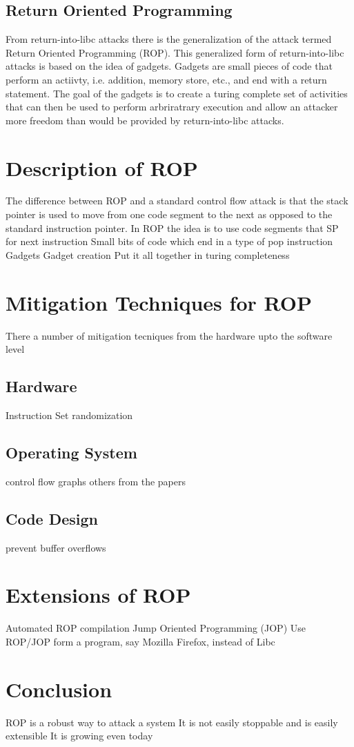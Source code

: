 \documentclass[11pt]{amsart}
\begin{document}
\subsection*{Return Oriented Programming}
From return-into-libc attacks there is the generalization of the attack termed Return Oriented Programming (ROP).  This generalized form of return-into-libc attacks is based on the idea of gadgets.  Gadgets are small pieces of code that perform an actiivty, i.e. addition, memory store, etc., and end with a return statement.  The goal of the gadgets is to create a turing complete set of activities that can then be used to perform arbriratrary execution and allow an attacker more freedom than would be provided by return-into-libc attacks.
\section*{Description of ROP}
The difference between ROP and a standard control flow attack is that the stack pointer is used to move from one code segment to the next as opposed to the standard instruction pointer.  In ROP the idea is to use code segments that 
SP for next instruction
Small bits of code which end in a type of pop instruction
Gadgets
Gadget creation
Put it all together in turing completeness
\section*{Mitigation Techniques for ROP}
There a number of mitigation tecniques from the hardware upto the software level
\subsection*{Hardware}
Instruction Set randomization
\subsection*{Operating System}
control flow graphs
others from the papers
\subsection*{Code Design}
prevent buffer overflows
\section*{Extensions of ROP}
Automated ROP compilation
Jump Oriented Programming (JOP)
Use ROP/JOP form a program, say Mozilla Firefox, instead of Libc
\section*{Conclusion}
ROP is a robust way to attack a system
It is not easily stoppable and is easily extensible
It is growing even today
\end{document}
